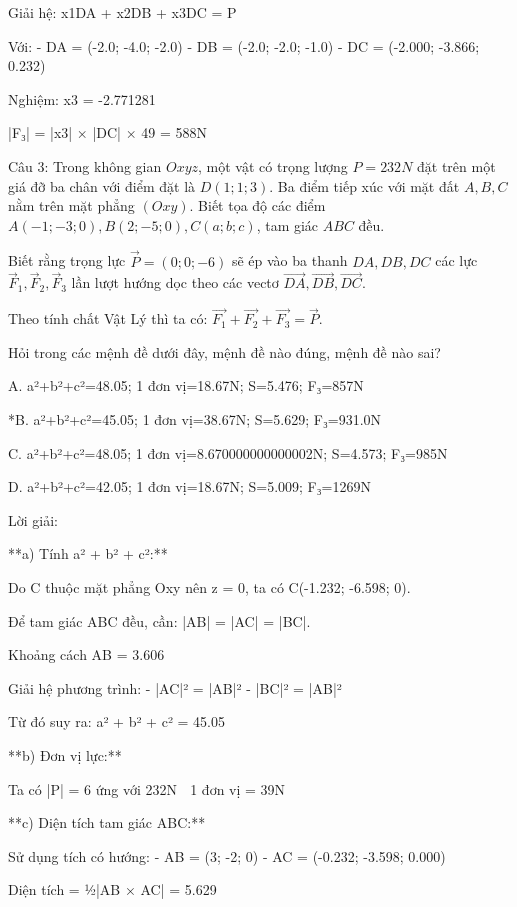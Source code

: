 \documentclass[a4paper,12pt]{article}
\begin{document}
Giải hệ: x1DA⃗ + x2DB⃗ + x3DC⃗ = P⃗

Với:
- DA⃗ = (-2.0; -4.0; -2.0)
- DB⃗ = (-2.0; -2.0; -1.0)
- DC⃗ = (-2.000; -3.866; 0.232)

Nghiệm: x3 = -2.771281

|F₃| = |x3| × |DC⃗| × 49 = 588N




Câu 3: Trong không gian \(Oxyz\), một vật có trọng lượng \(P=232N\) đặt trên một giá đỡ ba chân với điểm đặt là \(D(1; 1; 3)\). Ba điểm tiếp xúc với mặt đất \(A, B, C\) nằm trên mặt phẳng \((Oxy)\). Biết tọa độ các điểm \(A(-1; -3; 0), B(2; -5; 0), C(a; b; c)\), tam giác \(ABC\) đều. 

Biết rằng trọng lực \(\overrightarrow{P}=(0; 0; -6)\) sẽ ép vào ba thanh \(DA, DB, DC\) các lực \(\overrightarrow{F}_1, \overrightarrow{F}_2, \overrightarrow{F}_3\) lần lượt hướng dọc theo các vectơ \(\overrightarrow{DA}, \overrightarrow{DB}, \overrightarrow{DC}\). 

Theo tính chất Vật Lý thì ta có: \(\overrightarrow{F_1}+\overrightarrow{F_2}+\overrightarrow{F_3}=\overrightarrow{P}\).

Hỏi trong các mệnh đề dưới đây, mệnh đề nào đúng, mệnh đề nào sai?

A. a²+b²+c²=48.05; 1 đơn vị=18.67N; S=5.476; F₃=857N

*B. a²+b²+c²=45.05; 1 đơn vị=38.67N; S=5.629; F₃=931.0N

C. a²+b²+c²=48.05; 1 đơn vị=8.670000000000002N; S=4.573; F₃=985N

D. a²+b²+c²=42.05; 1 đơn vị=18.67N; S=5.009; F₃=1269N

Lời giải:


**a) Tính a² + b² + c²:**

Do C thuộc mặt phẳng Oxy nên z = 0, ta có C(-1.232; -6.598; 0).

Để tam giác ABC đều, cần: |AB| = |AC| = |BC|.

Khoảng cách AB = 3.606

Giải hệ phương trình:
- |AC|² = |AB|²  
- |BC|² = |AB|²

Từ đó suy ra: a² + b² + c² = 45.05

**b) Đơn vị lực:**

Ta có |P⃗| = 6 ứng với 232N
⟹ 1 đơn vị = 39N

**c) Diện tích tam giác ABC:**

Sử dụng tích có hướng:
- AB⃗ = (3; -2; 0)
- AC⃗ = (-0.232; -3.598; 0.000)

Diện tích = ½|AB⃗ × AC⃗| = 5.629
\end{document}
